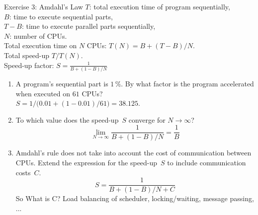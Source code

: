 \documentclass[10pt]{beamer}
\begin{document}
        \begin{frame}[allowframebreaks]{Exercise 3: Amdahl's Law}
            $T$: total execution time of program sequentially, \vspace{0.5cm} \\
            $B$: time to execute sequential parts, \vspace{0.5cm} \\
            $T-B$: time to execute parallel parts sequentially, \vspace{0.5cm} \\
            $N$: number of CPUs. \vspace{0.5cm} \\
            Total execution time on $N$ CPUs: $T(N) = B + (T - B) / N$. \vspace{0.5cm} \\
            Total speed-up $T / T(N)$. \vspace{0.5cm} \\
            Speed-up factor: $S = \frac{1}{B + (1 - B)/N}$ \vspace{0.5cm} \\
            \framebreak
            \begin{enumerate}
                \item A program's sequential part is $1\,\%$.
                    By what factor is the program accelerated when executed on $61$ CPUs? \\
                    \alert{$S =  1 / \bigl( 0.01 + (1 - 0.01) / 61 \bigr) = 38.125$.}

                \item To which value does the speed-up~$S$ converge for $N \rightarrow \infty$? \\
                    \alert{
                        \[ \lim_{N\rightarrow\infty} \frac{1}{B + (1-B)/N} = \frac{1}{B} \]
                    }

                \item Amdahl's rule does not take into account the cost of communication between CPUs.
                    Extend the expression for the speed-up~$S$ to include communication costs~$C$.
                    \alert{\[ S = \frac{1}{B + (1 - B)/N + C} \]
                    So What is C? Load balancing of scheduler, locking/waiting, message passing, ... }


\end{enumerate}
\end{frame}
\end{document}
